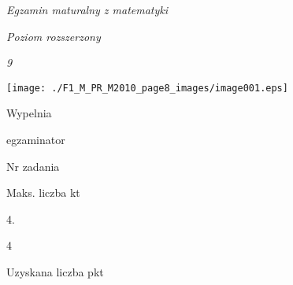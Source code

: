 \documentclass[a4paper,12pt]{article}
\begin{document}
{\it Egzamin maturalny z matematyki}

{\it Poziom rozszerzony}

{\it 9}
\begin{center}
\texttt{[image: ./F1\_M\_PR\_M2010\_page8\_images/image001.eps]}
\end{center}
Wypelnia

egzaminator

Nr zadania

Maks. liczba kt

4.

4

Uzyskana liczba pkt
\end{document}
